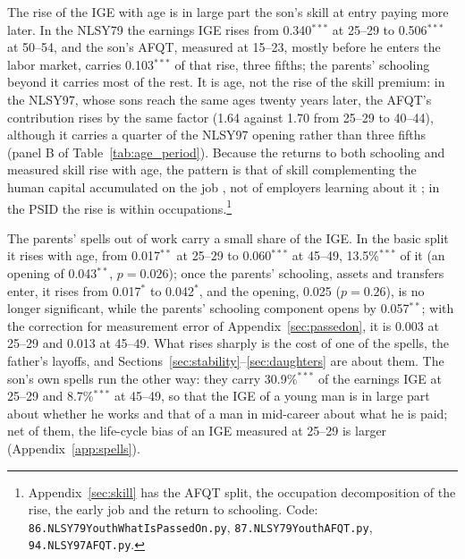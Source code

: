 The rise of the IGE with age is in large part the son's skill at entry paying more later. In the NLSY79 the earnings IGE rises
from 0.340$^{***}$ at 25--29 to 0.506$^{***}$ at 50--54, and the son's AFQT, measured at 15--23, mostly before he enters the labor market,
carries 0.103$^{***}$ of that rise, three fifths; the parents' schooling beyond it carries most of the rest. It is age,
not the rise of the skill premium: in the NLSY97, whose sons reach the same ages twenty years later, the AFQT's
contribution rises by the same factor (1.64 against 1.70 from 25--29 to 40--44), although it carries a quarter of the
NLSY97 opening rather than three fifths (panel B of Table~\ref{tab:age_period}). Because the returns to both schooling
and measured skill rise with age, the pattern is that of skill complementing the human capital accumulated on the job
\citep{bhuller2017life}, not of employers learning about it \citep{altonji2001employer, lange2007speed}; in the PSID the
rise is within occupations.\footnote{Appendix~\ref{sec:skill} has the AFQT split, the occupation decomposition of the
rise, the early job and the return to schooling. Code: \texttt{86.NLSY79YouthWhatIsPassedOn.py},
\texttt{87.NLSY79YouthAFQT.py}, \texttt{94.NLSY97AFQT.py}.}

The parents' spells out of work carry a small share of the IGE. In the basic split it rises with age, from
0.017$^{**}$ at 25--29 to 0.060$^{***}$ at 45--49, 13.5\%$^{***}$ of it (an opening of 0.043$^{**}$, $p = 0.026$); once
the parents' schooling, assets and transfers enter, it rises from 0.017$^{*}$ to 0.042$^{*}$, and the opening, 0.025
($p = 0.26$), is no longer significant, while the parents' schooling component opens by 0.057$^{**}$; with
the correction for measurement error of Appendix~\ref{sec:passedon}, it is 0.003 at 25--29 and 0.013 at 45--49. What rises
sharply is the cost of one of the spells, the father's layoffs, and Sections~\ref{sec:stability}--\ref{sec:daughters}
are about them. The son's own spells run the other way: they carry 30.9\%$^{***}$ of the earnings IGE at 25--29 and
8.7\%$^{***}$ at 45--49, so that the IGE of a young man is in large part about whether he works and that of a man in
mid-career about what he is paid; net of them, the life-cycle bias of an IGE measured at 25--29 is larger (Appendix~\ref{app:spells}).

